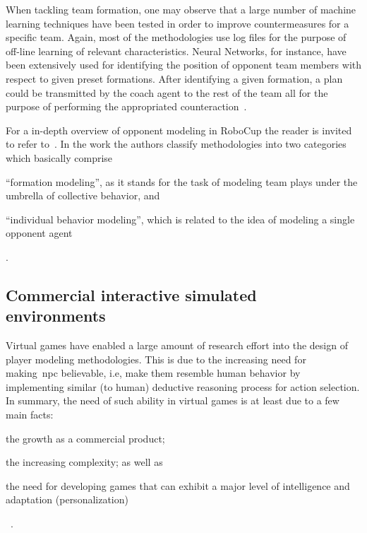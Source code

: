 When tackling team formation, one may observe that a large number of machine learning techniques have been tested in order to improve countermeasures for a specific team. Again, most of the methodologies use log files for the purpose of off-line learning of relevant characteristics. Neural Networks, for instance, have been extensively used for identifying the position of opponent team members with respect to given preset formations. After identifying a given formation, a plan could be transmitted by the coach agent to the rest of the team all for the purpose of performing the appropriated counteraction~\citep{nakashima_off-line_2010,ramos_discovering_2008, faria_machine_2010, visser_recognizing_2001}.

For a in-depth overview of opponent modeling in RoboCup the reader is invited to refer to~\cite{rofer_overview_2012}. In the work the authors classify methodologies into two categories which basically comprise \begin{inparaenum}\item``formation modeling'', as it stands for the task of modeling team plays under the umbrella of collective behavior, and \item``individual behavior modeling'', which is related to the idea of modeling a single opponent agent\end{inparaenum}.


\subsection{Commercial interactive simulated environments}

Virtual games have enabled a large amount of research effort into the design of player modeling methodologies. This is due to the increasing need for making~\gls{npc} believable, i.e, make them resemble human behavior by implementing similar (to human) deductive reasoning process for action selection. In summary, the need of such ability in virtual games is at least due to a few main facts: \begin{inparaenum}\item the growth as a commercial product; \item the increasing complexity; as well as \item the need for developing games that can exhibit a major level of intelligence and adaptation (personalization)\end{inparaenum}~\citep{bakkes_personalised_2012}. 

